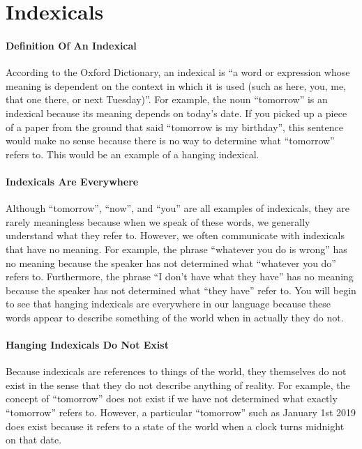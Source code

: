\documentclass[a4paper, 12pt]{article}
\begin{document}
\section*{Indexicals}
\paragraph{Definition Of An Indexical}
According to the Oxford Dictionary, an indexical is ``a word or expression whose meaning is dependent on the context in which it is used (such as here, you, me, that one there, or next Tuesday)''. For example, the noun ``tomorrow'' is an indexical because its meaning depends on today's date. If you picked up a piece of a paper from the ground that said ``tomorrow is my birthday'', this sentence would make no sense because there is no way to determine what ``tomorrow'' refers to. This would be an example of a hanging indexical.
\paragraph{Indexicals Are Everywhere}
Although ``tomorrow'', ``now'', and ``you'' are all examples of indexicals, they are rarely meaningless because when we speak of these words, we generally understand what they refer to. However, we often communicate with indexicals that have no meaning. For example, the phrase ``whatever you do is wrong'' has no meaning because the speaker has not determined what ``whatever you do'' refers to. Furthermore, the phrase ``I don't have what they have'' has no meaning because the speaker has not determined what ``they have'' refer to. You will begin to see that hanging indexicals are everywhere in our language because these words appear to describe something of the world when in actually they do not.
\paragraph{Hanging Indexicals Do Not Exist}
Because indexicals are references to things of the world, they themselves do not exist in the sense that they do not describe anything of reality. For example, the concept of ``tomorrow'' does not exist if we have not determined what exactly ``tomorrow'' refers to. However, a particular ``tomorrow'' such as January 1st 2019 does exist because it refers to a state of the world when a clock turns midnight on that date.
\end{document}
